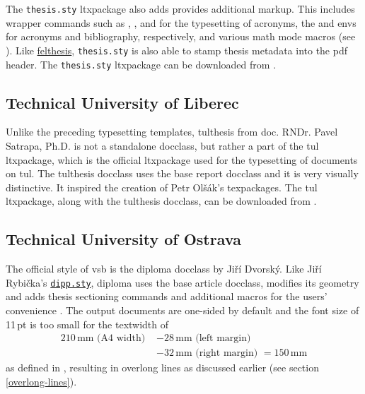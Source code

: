   The \texttt{thesis.sty} \gls{ltxpackage} also adds provides additional markup. This includes wrapper commands such as , ,  and  for the typesetting of acronyms, the  and  \glspl{env} for acronyms and bibliography, respectively, and various math mode macros (see \cite[p.~6--9]{thesis.sty-doc}). Like \hyperref[sec:felthesis]{felthesis}, \texttt{thesis.sty} is also able to stamp thesis metadata into the \gls{pdf} header. The \texttt{thesis.sty} \gls{ltxpackage} can be downloaded from \cite{thesis.sty}.

  \subsection{Technical University of Liberec}
  Unlike the preceding typesetting templates, tulthesis from doc. RNDr. Pavel Satrapa, Ph.D. is not a standalone \gls{docclass}, but rather a part of the tul \gls{ltxpackage}, which is the official \gls{ltxpackage} used for the typesetting of documents on \gls{tul}. The tulthesis \gls{docclass} uses the base report \gls{docclass} \cite[section~1]{tulthesis-man} and it is very visually distinctive. It inspired \cite[post~21]{ctustyle-forums} the creation of Petr Olšák's  \glspl{texpackage}. The tul \gls{ltxpackage}, along with the tulthesis \gls{docclass}, can be downloaded from \cite{tul}.

  \subsection{Technical University of Ostrava}
  The official style of \gls{vsb} is the diploma \gls{docclass} by Jiří Dvorský. Like Jiří Rybička's \hyperref[sec:dipp.sty]{\tt dipp.sty}, diploma uses the base article \gls{docclass}, modifies its geometry and adds thesis sectioning commands and additional macros for the users' convenience \cite{diploma}. The output documents are one-sided by default and the font size of 11\,pt is too small for the \gls{textwidth} of \begin{equation}
    \begin{split}
      210\,\text{mm} \text{ (A4 width) } &- 28\,\text{mm} \text{ (left margin) }  \\
                                         &- 32\,\text{mm} \text{ (right margin) }
                                          = 150\,\text{mm}
    \end{split}
  \end{equation} as defined in \cite[lines~111,~123]{diplomaSource}, resulting in overlong lines as discussed earlier (see section \ref{overlong-lines}).

